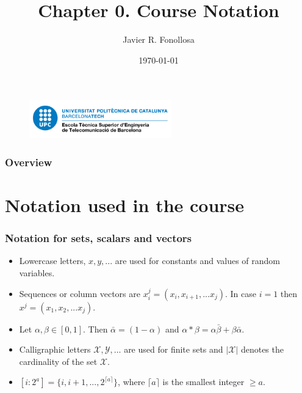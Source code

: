 \documentclass{beamer}
\title[Notation]{Chapter 0. Course Notation} %
\author{Javier R. Fonollosa} %
\institute[ETSETB-TSC] %
{
Universitat Polit\`{e}cnica de Catalunya \\ %
\medskip
\textit{javier.fonollosa@upc.edu} %
}
\date{\today} %
\begin{document}
\begin{frame}
\titlepage %
\begin{figure}
    \centering
    \includegraphics[width = 0.55\textwidth]{ETSETB-positiu-p3005.png}
\end{figure}
\end{frame}

\begin{frame}
\frametitle{Overview} %
  \tableofcontents
\end{frame}


\section{Notation used in the course} %


\begin{frame}
\frametitle{Notation for sets, scalars and vectors}
\begin{itemize}
\item Lowercase letters, $x,y,...$ are used for constants and values of random variables. \item Sequences or column vectors are $x_i^j=(x_i, x_{i+1}, ...x_j)$. In case $i=1$ then $x^j=(x_1, x_2, ...x_j)$.
\item Let $\alpha, \beta \in [0,1]$. Then $\bar{\alpha}=(1-\alpha)$ and $\alpha * \beta = \alpha \bar{\beta}+\beta \bar{\alpha}$.
\item Calligraphic letters $\mathcal{X,Y, ...}$ are used for finite sets and $|\mathcal{X}|$ denotes the cardinality of the set $\mathcal{X}$.
\item $[i:2^a]=\{i, i+1, ..., 2^{\lceil{a}\rceil}\}$, where $\lceil{a}\rceil$ is the smallest integer $\geq a$.
\end{itemize}
\end{frame}
\end{document}
